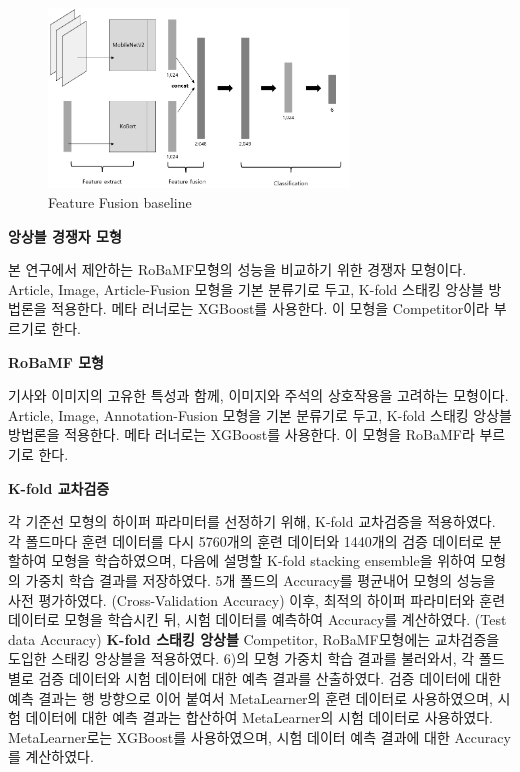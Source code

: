 \documentclass{article}
\begin{document}
\begin{figure}[ht]
    \centering
    \includegraphics[width=8cm]{ENG/feature-fusion-baseline.png}
    \caption{Feature Fusion baseline}
    \label{fig.4}
\end{figure}

\textbf{앙상블 경쟁자 모형}

본 연구에서 제안하는 RoBaMF모형의 성능을 비교하기 위한 경쟁자 모형이다.
Article, Image, Article-Fusion 모형을 기본 분류기로 두고, K-fold 스태킹 앙상블 방법론을 적용한다. 메타 러너로는 XGBoost를 사용한다.
이 모형을 Competitor이라 부르기로 한다.



\textbf{RoBaMF 모형}

기사와 이미지의 고유한 특성과 함께, 이미지와 주석의 상호작용을 고려하는 모형이다.
Article, Image, Annotation-Fusion 모형을 기본 분류기로 두고, K-fold 스태킹 앙상블 방법론을 적용한다. 메타 러너로는 XGBoost를 사용한다.
이 모형을 RoBaMF라 부르기로 한다.



\textbf{K-fold 교차검증}

각 기준선 모형의 하이퍼 파라미터를 선정하기 위해, K-fold 교차검증을 적용하였다.
각 폴드마다 훈련 데이터를 다시 5760개의 훈련 데이터와 1440개의 검증 데이터로 분할하여 모형을 학습하였으며, 다음에 설명할 K-fold stacking ensemble을 위하여 모형의 가중치 학습 결과를 저장하였다. 5개 폴드의 Accuracy를 평균내어 모형의 성능을 사전 평가하였다. (Cross-Validation Accuracy)
이후, 최적의 하이퍼 파라미터와 훈련 데이터로 모형을 학습시킨 뒤, 시험 데이터를 예측하여 Accuracy를 계산하였다. (Test data Accuracy)
\textbf{K-fold 스태킹 앙상블}
Competitor, RoBaMF모형에는 교차검증을 도입한 스태킹 앙상블을 적용하였다.
6)의 모형 가중치 학습 결과를 불러와서, 각 폴드별로 검증 데이터와 시험 데이터에 대한 예측 결과를 산출하였다.
검증 데이터에 대한 예측 결과는 행 방향으로 이어 붙여서 MetaLearner의 훈련 데이터로 사용하였으며,
시험 데이터에 대한 예측 결과는 합산하여 MetaLearner의 시험 데이터로 사용하였다.
MetaLearner로는 XGBoost를 사용하였으며, 시험 데이터 예측 결과에 대한 Accuracy를 계산하였다.
\end{document}
